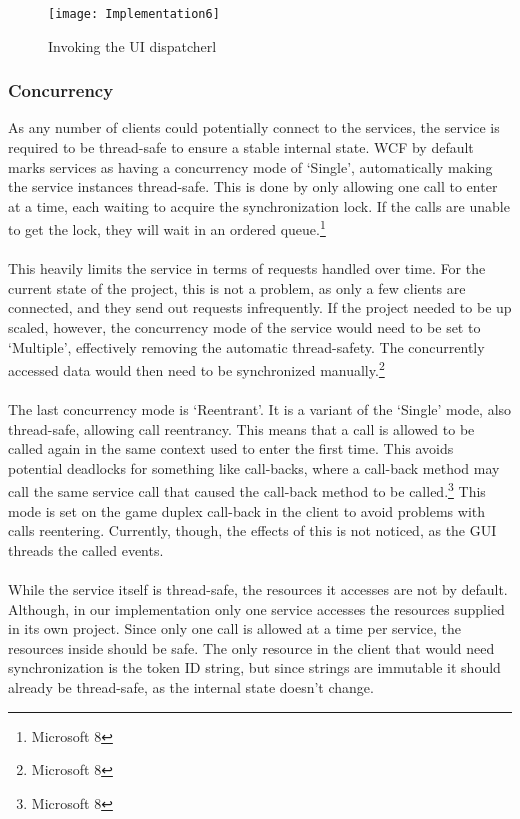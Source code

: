 \begin{figure}[h]
\centerline{\texttt{[image: Implementation6]}}
\caption {Invoking the UI dispatcherl}
\label {fig:implementation6}
\end{figure}

\subsubsection {Concurrency}
As any number of clients could potentially connect to the services, the
service is required to be thread-safe to ensure a stable internal state.
WCF by default marks services as having a concurrency mode of ‘Single’,
 automatically making the service instances thread-safe. This is done by
  only allowing one call to enter at a time, each waiting to acquire the
  synchronization lock. If the calls are unable to get the lock, they will
   wait in an ordered queue.\footnote{Microsoft 8}
\\\\
This heavily limits the service in terms of requests handled over time. For
 the current state of the project, this is not a problem, as only a few
  clients are connected, and they send out requests infrequently. If the
  project needed to be up scaled, however, the concurrency mode of the
  service would need to be set to ‘Multiple’, effectively removing the
  automatic thread-safety. The concurrently accessed data would then
   need to be synchronized manually.\footnote{Microsoft 8}
\\\\
The last concurrency mode is ‘Reentrant’. It is a variant of the ‘Single’
 mode, also thread-safe, allowing call reentrancy. This means that a call
 is allowed to be called again in the same context used to enter the first
 time. This avoids potential deadlocks for something like call-backs, where
  a call-back method may call the same service call that caused the call-back
   method to be called.\footnote{Microsoft 8} This mode is set on the game
   duplex call-back in the client to avoid problems with calls reentering.
   Currently, though, the effects of this is not noticed, as the GUI threads
    the called events.
\\\\
While the service itself is thread-safe, the resources it accesses are not by
 default. Although, in our implementation only one service accesses the
 resources supplied in its own project. Since only one call is allowed at a
  time per service, the resources inside should be safe. The only resource
  in the client that would need synchronization is the token ID string, but
   since strings are immutable it should already be thread-safe, as the
    internal state doesn’t change.


